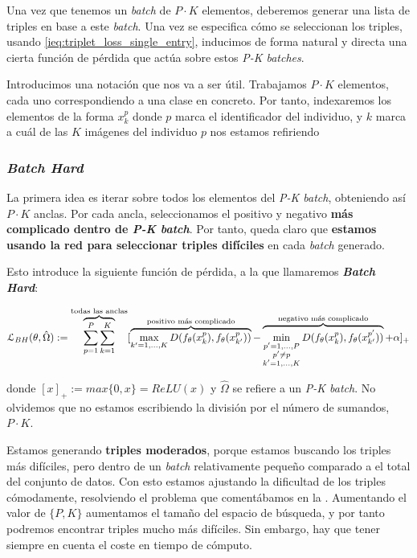 Una vez que tenemos un \textit{batch} de $P \cdot K$ elementos, deberemos generar una lista de triples en base a este \textit{batch}. Una vez se especifica cómo se seleccionan los triples, usando \eqref{ieq:triplet_loss_single_entry}, inducimos de forma natural y directa una cierta función de pérdida que actúa sobre estos \textit{P-K batches}.

Introducimos una notación que nos va a ser útil. Trabajamos $P \cdot K$ elementos, cada uno correspondiendo a una clase en concreto. Por tanto, indexaremos los elementos de la forma $x_k^p$ donde $p$ marca el identificador del individuo, y $k$ marca a cuál de las $K$ imágenes del individuo $p$ nos estamos refiriendo

\subsubsection{\textit{Batch Hard}} \label{isubsubs:batch_hard}

La primera idea es iterar sobre todos los elementos del \textit{P-K batch}, obteniendo así $P \cdot K$ anclas. Por cada ancla, seleccionamos el positivo y negativo \textbf{más complicado dentro de \textit{P-K batch}}. Por tanto, queda claro que \textbf{estamos usando la red para seleccionar triples difíciles} en cada \textit{batch} generado.

Esto introduce la siguiente función de pérdida, a la que llamaremos \textbf{\textit{Batch Hard}}:

\begin{equation}
    \mathcal{L}_{BH}(\theta, \hat{\Omega}) := \overbrace{\sum_{p = 1}^P \sum_{k = 1}^K}^\textrm{\text{todas las anclas}} [
        \overbrace{\max_{k' = 1, \ldots, K} D(f_{\theta}(x_k^p), f_{\theta}(x_{k'}^p))}^\textrm{\text{positivo más complicado}}
        - \overbrace{\min_{\substack{p' = 1, \ldots, P \\ p' \neq p \\ k' = 1, \ldots, K}} D(f_{\theta}(x_k^p), f_{\theta}(x_{k'}^{p'}))}^\textrm{\text{negativo más complicado}}
        + \alpha]_+
\end{equation}

donde $[x]_+ := max \{0, x\} = ReLU(x)$ y $\hat{\Omega}$ se refiere a un \textit{P-K batch}. No olvidemos que no estamos escribiendo la división por el número de sumandos, $P \cdot K$.

Estamos generando \textbf{triples moderados}, porque estamos buscando los triples más difíciles, pero dentro de un \textit{batch} relativamente pequeño comparado a el total del conjunto de datos. Con esto estamos ajustando la dificultad de los triples cómodamente, resolviendo el problema que comentábamos en la . Aumentando el valor de $\{P, K\}$ aumentamos el tamaño del espacio de búsqueda, y por tanto podremos encontrar triples mucho más difíciles. Sin embargo, hay que tener siempre en cuenta el coste en tiempo de cómputo.

